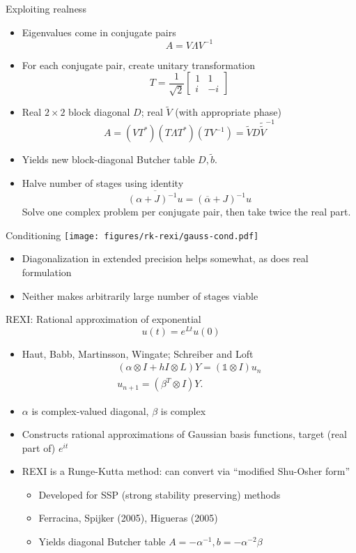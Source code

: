 \documentclass{beamer}
\begin{document}
\begin{frame}{Exploiting realness}
  \begin{itemize}
  \item Eigenvalues come in conjugate pairs
    $$ A = V \Lambda V^{-1} $$
  \item For each conjugate pair, create unitary transformation
    $$ T = \frac{1}{\sqrt 2} \begin{bmatrix} 1 & 1 \\ i & -i \end{bmatrix} $$
  \item Real $2\times 2$ block diagonal $D$; real $\tilde V$ (with appropriate phase)
    $$A = (V T^*) (T \Lambda T^*) (T V^{-1}) = \tilde V D \tilde \tilde V^{-1} $$
  \item Yields new block-diagonal Butcher table $D, \tilde b$.
    
  \item Halve number of stages using identity
    $$\overline{(\alpha + J)^{-1} u} = (\overline{\alpha} + J)^{-1} u $$
    Solve one complex problem per conjugate pair, then take twice the real part.
  \end{itemize}
\end{frame}

\begin{frame}{Conditioning}
  \texttt{[image: figures/rk-rexi/gauss-cond.pdf]}
  \begin{itemize}
  \item Diagonalization in extended precision helps somewhat, as does real formulation
  \item Neither makes arbitrarily large number of stages viable
  \end{itemize}
\end{frame}

\begin{frame}{REXI: Rational approximation of exponential}
  $$ u(t) = e^{Lt} u(0) $$
  \begin{itemize}
  \item Haut, Babb, Martinsson, Wingate; Schreiber and Loft
    \begin{gather*} (\alpha \otimes I + h I \otimes L) Y = (\mathbb 1 \otimes I) u_n \\
      u_{n+1} = (\beta^T \otimes I) Y . \end{gather*}
  \item $\alpha$ is complex-valued diagonal, $\beta$ is complex
  \item Constructs rational approximations of Gaussian basis functions, target (real part of) $e^{it}$
  \item REXI is a Runge-Kutta method: can convert via ``modified Shu-Osher form''
    \begin{itemize}
    \item Developed for SSP (strong stability preserving) methods
    \item Ferracina, Spijker (2005), Higueras (2005)
    \item Yields diagonal Butcher table $A = -\alpha^{-1}, b = -\alpha^{-2} \beta$
    \end{itemize}
  \end{itemize}
\end{frame}
\end{document}
